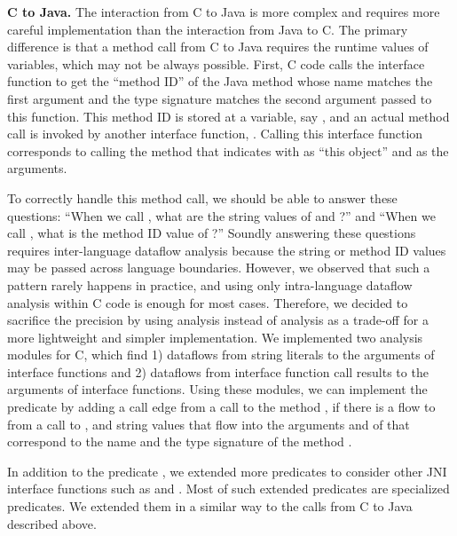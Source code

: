 \textbf{C to Java.} The interaction from C to Java is more complex and
requires more careful implementation than the interaction from Java to C.
The primary difference is that a method call from C to Java requires
the runtime values of variables, which may not be always possible.
First, C code calls the interface function 
to get the ``method ID'' of the Java method whose name matches the first argument
and the type signature matches the second argument passed to this function.
This method ID is stored at a variable, say , and
an actual method call is invoked by another
interface function, . Calling this interface 
function corresponds to calling the method that  indicates
with  as ``this object'' and  as the arguments.

To correctly handle this method call, we should be able to answer these
questions: ``When we call ,
what are the string values of  and ?'' and
``When we call , what is the method ID value of ?''
Soundly answering these questions requires inter-language dataflow analysis
because the string or method ID values may be passed across language boundaries.
However, we observed that such a pattern rarely happens in practice,
and using only intra-language dataflow analysis within C code is enough for most cases.
Therefore, we decided to sacrifice the precision
by using  analysis instead of  analysis
as a trade-off for a more lightweight and simpler implementation.
We implemented two  analysis modules for C,
which find 1) dataflows from string literals to the arguments of interface functions
and 2) dataflows from interface function call results to the arguments of interface functions.
Using these modules, we can implement the
predicate  by adding a call edge from a 
call to the method , if there is a flow to  from a
call to , and string values that flow into the
arguments  and  of  that
correspond to the name and the type signature of the method .

In addition to the predicate ,
we extended more predicates to consider other JNI interface functions such as
 and .
Most of such extended predicates are specialized  predicates.
We extended them in a similar way to the calls from C to Java described above.

